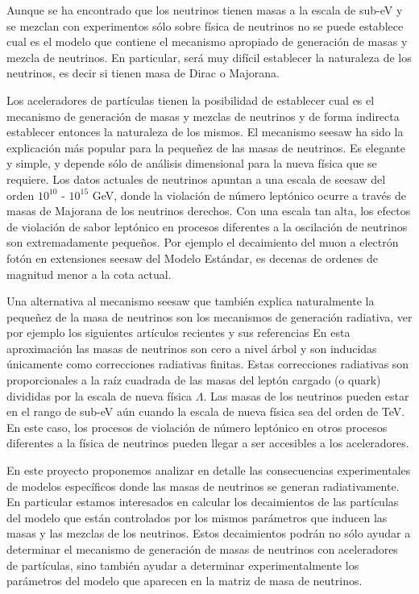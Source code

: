 \documentclass[11pt]{article}
\begin{document}
Aunque se ha encontrado que los neutrinos tienen masas a la escala de
sub-eV y se mezclan %
con experimentos sólo sobre
física de neutrinos no se puede establece cual es el modelo que contiene
el mecanismo apropiado de generación de masas y mezcla de neutrinos.
En particular, será muy difícil establecer la naturaleza de los
neutrinos, es decir si tienen masa de Dirac o Majorana.

Los aceleradores de partículas tienen la posibilidad de
establecer cual es el mecanismo de generación de masas y mezclas de
neutrinos y de forma indirecta establecer entonces la naturaleza de
los mismos. El mecanismo seesaw %
ha sido la
explicación más popular para la pequeñez de las masas de neutrinos. Es
elegante y simple, y depende sólo de análisis dimensional para la
nueva física que se requiere. Los datos actuales de neutrinos
apuntan a una escala de seesaw del orden $10^{10}$ - $10^{15}$ GeV,
donde la violación de número leptónico ocurre a través de masas de
Majorana de los neutrinos derechos. Con una escala tan alta, los
efectos de violación de sabor leptónico en procesos diferentes a la
oscilación de neutrinos son extremadamente pequeños. Por ejemplo el
decaimiento del muon a electrón fotón en extensiones seesaw del Modelo
Estándar, es decenas de ordenes de magnitud menor a la cota actual.

Una alternativa al mecanismo seesaw que también explica naturalmente
la pequeñez de la masa de neutrinos son los mecanismos de generación
radiativa, ver por ejemplo los siguientes artículos recientes y
sus referencias
En esta aproximación las masas de neutrinos son cero a nivel árbol y
son inducidas únicamente como correcciones radiativas finitas.  Estas
correcciones radiativas son proporcionales a la raíz cuadrada de
las masas del leptón cargado (o quark) divididas por la escala de nueva
física $\Lambda$. Las masas de los neutrinos pueden estar en el rango
de sub-eV aún cuando la escala de nueva física sea del orden de
TeV. En este caso, los procesos de violación de número leptónico en
otros procesos diferentes a la física de neutrinos pueden llegar
a ser accesibles a los aceleradores.

En este proyecto proponemos analizar en detalle las consecuencias
experimentales de modelos específicos donde las masas de
neutrinos se generan radiativamente. En particular estamos interesados
en calcular los decaimientos de las partículas del modelo que
están controlados por los mismos parámetros que inducen las masas y
las mezclas de los neutrinos. Estos decaimientos podrán no sólo
ayudar a determinar el mecanismo de generación de masas de neutrinos
con aceleradores de partículas, sino también ayudar a determinar
experimentalmente los parámetros del modelo que aparecen en la matriz
de masa de neutrinos.
\end{document}
